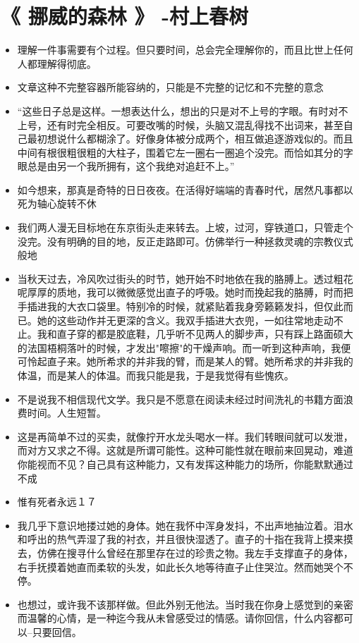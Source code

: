 \documentclass[UTF8,a4paper,8pt]{ctexbook}
\begin{document}
\newpage
\section{《 挪威的森林 》 -村上春树 }
	\begin{itemize}
		\item 理解一件事需要有个过程。但只要时间，总会完全理解你的，而且比世上任何人都理解得彻底。
		\item 文章这种不完整容器所能容纳的，只能是不完整的记忆和不完整的意念
		\item “这些日子总是这样。一想表达什么，想出的只是对不上号的字眼。有时对不上号，还有时完全相反。可要改嘴的时候，头脑又混乱得找不出词来，甚至自己最初想说什么都糊涂了。好像身体被分成两个，相互做追逐游戏似的。而且中间有根很粗很粗的大柱子，围着它左一圈右一圈追个没完。而恰如其分的字眼总是由另一个我所拥有，这个我绝对追赶不上。”
		\item 如今想来，那真是奇特的日日夜夜。在活得好端端的青春时代，居然凡事都以死为轴心旋转不休
		\item 我们两人漫无目标地在东京街头走来转去。上坡，过河，穿铁道口，只管走个没完。没有明确的目的地，反正走路即可。仿佛举行一种拯救灵魂的宗教仪式般地
		\item 当秋天过去，冷风吹过街头的时节，她开始不时地依在我的胳膊上。透过粗花呢厚厚的质地，我可以微微感觉出直子的呼吸。她时而挽起我的胳膊，时而把手插进我的大衣口袋里。特别冷的时候，就紧贴着我身旁籁籁发抖，但仅此而已。她的这些动作并无更深的含义。我双手插进大衣兜，一如往常地走动不止。我和直子穿的都是胶底鞋，几乎听不见两人的脚步声，只有踩上路面硕大的法国梧桐落叶的时候，才发出"嚓擦"的干燥声响。而一听到这种声响，我便可怜起直子来。她所希求的并非我的臂，而是某人的臂。她所希求的并非我的体温，而是某人的体温。而我只能是我，于是我觉得有些愧疚。
		\item 不是说我不相信现代文学。我只是不愿意在阅读未经过时间洗礼的书籍方面浪费时间。人生短暂。
		\item 这是再简单不过的买卖，就像拧开水龙头喝水一样。我们转眼间就可以发泄，而对方又求之不得。这就是所谓可能性。这种可能性就在眼前来回晃动，难道你能视而不见？自己具有这种能力，又有发挥这种能力的场所，你能默默通过不成
		\item 惟有死者永远１７
		\item 我几乎下意识地搂过她的身体。她在我怀中浑身发抖，不出声地抽泣着。泪水和呼出的热气弄湿了我的衬衣，并且很快湿透了。直子的十指在我背上摸来摸去，仿佛在搜寻什么曾经在那里存在过的珍贵之物。我左手支撑直子的身体，右手抚摸着她直而柔软的头发，如此长久地等待直子止住哭泣。然而她哭个不停。
		\item 也想过，或许我不该那样做。但此外别无他法。当时我在你身上感觉到的亲密而温馨的心情，是一种迄今我从未曾感受过的情感。请你回信，什么内容都可以--只要回信。

\end{itemize}
\end{document}
